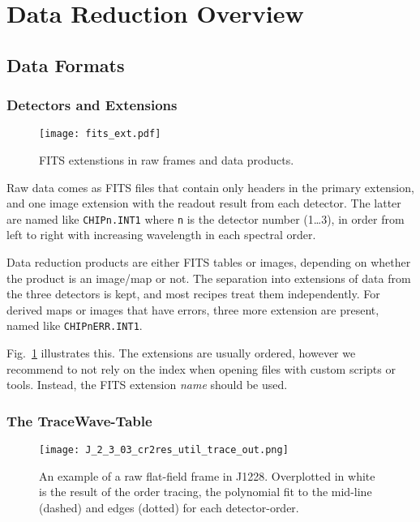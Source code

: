 \section{Data Reduction Overview}
\label{sec:overview}


\subsection{Data Formats}
\label{sec:data-fmt-quick}

\subsubsection{Detectors and Extensions}
\label{sec:extns}
\begin{figure}[!tb]
  \begin{center}
    \texttt{[image: fits\_ext.pdf]}
  \end{center}
  \caption{
    \label{fig:fits_ext}
    FITS extenstions in raw frames and data products.
    }
\end{figure}

Raw data comes as FITS files that contain only headers in the primary extension,
and one image extension with the readout result from each detector. The latter
are named like \verb!CHIPn.INT1! where \texttt{n} is the detector number (1…3),
in order from left to right with increasing wavelength in each spectral order.

Data reduction products are either FITS tables or images, depending on whether
the product is an image/map or not. The separation into extensions of data from
the three detectors is kept, and most recipes treat them independently. For
derived maps or images that have errors, three more extension are present, named
like \texttt{CHIPnERR.INT1}.

Fig.~\ref{fig:fits_ext} illustrates this. The extensions are usually ordered,
however we recommend to not rely on the index when opening files with custom
scripts or tools. Instead, the FITS extension \emph{name} should be used.

\subsubsection{The TraceWave-Table}
\label{sec:tracewave}

\begin{figure}[!tb]
    \begin{center}
      \texttt{[image: J\_2\_3\_03\_cr2res\_util\_trace\_out.png]}
    \end{center}
    \caption{
      \label{fig:flat_trace}
      An example of a raw flat-field frame in J1228. Overplotted in white is 
      the result of the order tracing, the polynomial fit to the mid-line
      (dashed) and edges (dotted) for each detector-order.
      }
  \end{figure}


